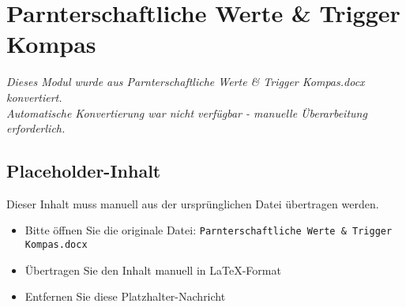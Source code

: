 
\section{Parnterschaftliche Werte & Trigger Kompas}
\label{sec:parnterschaftliche-werte-&-trigger-kompas}

\begin{center}
\textit{Dieses Modul wurde aus Parnterschaftliche Werte & Trigger Kompas.docx konvertiert.\\
Automatische Konvertierung war nicht verfügbar - manuelle Überarbeitung erforderlich.}
\end{center}


\subsection{Placeholder-Inhalt}

Dieser Inhalt muss manuell aus der ursprünglichen Datei übertragen werden.

\begin{itemize}
\item Bitte öffnen Sie die originale Datei: \texttt{Parnterschaftliche Werte & Trigger Kompas.docx}
\item Übertragen Sie den Inhalt manuell in LaTeX-Format
\item Entfernen Sie diese Platzhalter-Nachricht
\end{itemize}
